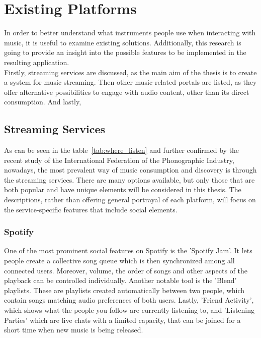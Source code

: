 \chapter{Existing Platforms}
In order to better understand what instruments people use when interacting with music,
it is useful to examine existing solutions. Additionally, this research is going to provide an insight
into the possible features to be implemented in the resulting application.\\
Firstly, streaming services are discussed, as the main aim of the thesis is to create a system for music streaming.
Then other music-related portals are listed, as they offer alternative possibilities to engage with audio content,
other than its direct consumption.
And lastly,



\section{Streaming Services}
As can be seen in the table~\ref{tab:where_listen} and further confirmed by
the recent study of the International Federation of the Phonographic Industry\cite{music_stats_2024},
nowadays, the most prevalent way of music consumption
and discovery is through the streaming services. There are many options available,
but only those that are both popular and have unique elements will be considered in this thesis.
The descriptions, rather than offering general portrayal of each platform,
will focus on the service-specific features that include social elements.

\subsection{Spotify}
One of the most prominent social features on Spotify is the 'Spotify Jam'\cite{spotify_jam}.
It lets people create a collective song queue which is then synchronized among all connected users.
Moreover, volume, the order of songs and other aspects of the playback can be controlled individually.
Another notable tool is the 'Blend' playlists\cite{spotify_recs}. These are playlists created automatically
between two people, which contain songs matching audio preferences of both users.
Lastly, 'Friend Activity'\cite{spotify_friend_activ}, which shows what the people you follow are currently listening to,
and 'Listening Parties' which are live chats with a limited capacity,
that can be joined for a short time when new music is being released\cite{spotify_party_1,spotify_party_2}.

